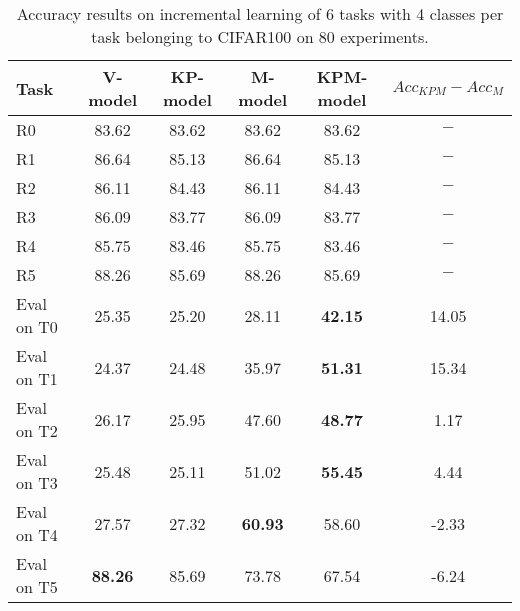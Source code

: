 \begin{table}[H]
\centering
\begin{tabular}{lccccc}
\toprule
Task  & V-model & KP-model & M-model & KPM-model & $Acc_{KPM}-Acc_{M}$ \\
\midrule
R0 & 83.62 & 83.62 & 83.62 & 83.62 & $-$ \\
R1 & 86.64 & 85.13 & 86.64 & 85.13 & $-$ \\
R2 & 86.11 & 84.43 & 86.11 & 84.43 & $-$ \\
R3 & 86.09 & 83.77 & 86.09 & 83.77 & $-$ \\
R4 & 85.75 & 83.46 & 85.75 & 83.46 & $-$ \\
R5 & 88.26 & 85.69 & 88.26 & 85.69 & $-$ \\

 \hline 
Eval on T0 & 25.35 & 25.20 & 28.11 & \textbf{42.15} & 14.05 \\
Eval on T1 & 24.37 & 24.48 & 35.97 & \textbf{51.31} & 15.34 \\
Eval on T2 & 26.17 & 25.95 & 47.60 & \textbf{48.77} & 1.17 \\
Eval on T3 & 25.48 & 25.11 & 51.02 & \textbf{55.45} & 4.44 \\
Eval on T4 & 27.57 & 27.32 & \textbf{60.93} & 58.60 & -2.33 \\
Eval on T5 & \textbf{88.26} & 85.69 & 73.78 & 67.54 & -6.24 \\
\bottomrule
\end{tabular}
\caption{Accuracy results on incremental learning of 6 tasks with 4 classes per task belonging to CIFAR100 on 80 experiments.}
\end{table}
